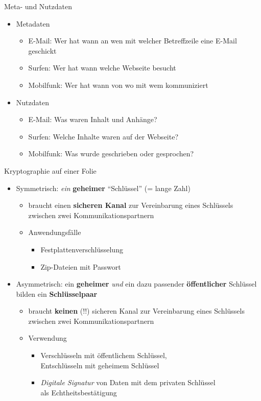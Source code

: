   \begin{frame}{Meta- und Nutzdaten}
    \begin{itemize}
      \item Metadaten
      \begin{itemize}
        \item E-Mail: Wer hat wann an wen mit welcher Betreffzeile eine E-Mail geschickt
        \item Surfen: Wer hat wann welche Webseite besucht
        \item Mobilfunk: Wer hat wann von wo mit wem kommuniziert
      \end{itemize}
      \item Nutzdaten
      \begin{itemize}
        \item E-Mail: Was waren Inhalt und Anhänge?
        \item Surfen: Welche Inhalte waren auf der Webseite?
        \item Mobilfunk: Was wurde geschrieben oder gesprochen?
      \end{itemize}
    \end{itemize}
  \end{frame}

  \begin{frame}{Kryptographie auf einer Folie}
    \begin{itemize}
      \item Symmetrisch: \textit{ein} \textbf{geheimer} ``Schlüssel'' (= lange Zahl)
      \begin{itemize}
        \item braucht einen \textbf{sicheren Kanal} zur Vereinbarung eines Schlüssels zwischen zwei Kommunikationspartnern
        \item Anwendungsfälle
        \begin{itemize}
          \item Festplattenverschlüsselung
          \item Zip-Dateien mit Passwort
        \end{itemize}
      \end{itemize}
      \item Asymmetrisch: ein \textbf{geheimer} \textit{und} ein dazu passender \textbf{öffentlicher} Schlüssel bilden ein \textbf{Schlüsselpaar}
      \begin{itemize}
        \item braucht \textbf{keinen} (!!) sicheren Kanal zur Vereinbarung eines Schlüssels zwischen zwei Kommunikationspartnern
        \item Verwendung
          \begin{itemize}
            \item Verschlüsseln mit öffentlichem Schlüssel,\\Entschlüsseln mit geheimem Schlüssel
            \item \textit{Digitale Signatur} von Daten mit dem privaten Schlüssel\\als Echtheitsbestätigung
          \end{itemize}
      \end{itemize}
    \end{itemize}
  \end{frame}

